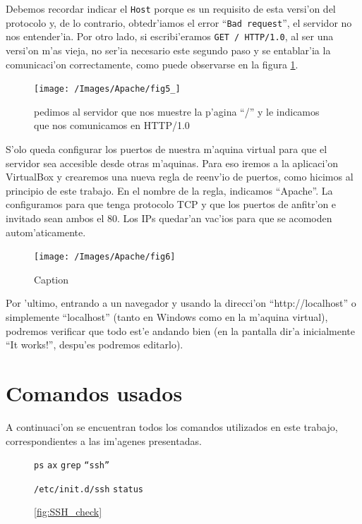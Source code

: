\documentclass[11pt]{article}
\newcommand{\imagecaption}[1]{\vspace{-7pt}\caption*{\char91\ref{fig:#1}\char93}}
\newcommand{\codetext}[2]{\large\texttt{\textcolor{#1}{#2}}}
\begin{document}
		Debemos recordar indicar el \texttt{Host} porque es un requisito de esta versi'on del protocolo y, de lo contrario, obtedr'iamos el error ``\texttt{Bad request}'', el servidor no nos entender'ia. Por otro lado, si escribi'eramos \texttt{GET / HTTP/1.0}, al ser una versi'on m'as vieja, no ser'ia necesario este segundo paso y se entablar'ia la comunicaci'on correctamente, como puede observarse en la figura \ref{fig:5}.

		\begin{figure}[H]
    			\centering
    			\texttt{[image: /Images/Apache/fig5\_]}
    			\caption{pedimos al servidor que nos muestre la p'agina ``/'' y le indicamos que nos comunicamos en HTTP/1.0}
    			\label{fig:5}
		\end{figure}

		S'olo queda configurar los puertos de nuestra m'aquina virtual para que el servidor sea accesible desde otras m'aquinas. Para eso iremos a la aplicaci'on VirtualBox y crearemos una nueva regla de reenv'io de puertos, como hicimos al principio de este trabajo. En el nombre de la regla, indicamos ``Apache''. La configuramos para que tenga protocolo TCP y que los puertos de anfitr'on e invitado sean ambos el 80. Los IPs quedar'an vac'ios para que se acomoden autom'aticamente.

		\begin{figure}[H]
    			\centering
    			\texttt{[image: /Images/Apache/fig6]}
   			\caption{Caption}
    			\label{fig:6}
		\end{figure}

		Por 'ultimo, entrando a un navegador y usando la direcci'on ``http://localhost'' o simplemente ``localhost'' (tanto en Windows como en la m'aquina virtual), podremos verificar que todo est'e andando bien (en la pantalla dir'a inicialmente  ``It works!'', despu'es podremos editarlo).

		
	\section{Comandos usados}
		A continuaci'on se encuentran todos los comandos utilizados en este trabajo, correspondientes a las im'agenes presentadas.
		
		\begin{figure}[H]
			\centering
			\begin{code-box}
				\codetext{light-blue}{ps} \codetext{light-orange}{ax} \textbar\/ \codetext{light-blue}{grep} \codetext{light-red}{``ssh''}
				
				\codetext{light-blue}{/etc/init.d/ssh} \codetext{light-orange}{status}
			\end{code-box}
			\imagecaption{SSH_check}
		\end{figure}
		
\end{document}
